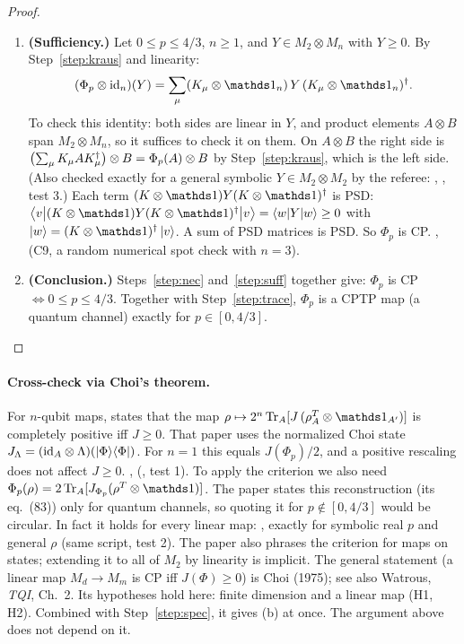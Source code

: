 \documentclass[11pt]{article}
\begin{document}
\begin{proof}
\begin{enumerate}
  \item\label{step:suff} \textbf{(Sufficiency.)} Let $0\le p\le4/3$, $n\ge1$, and
    $Y\in M_2\otimes M_n$ with $Y\ge0$. By Step~\ref{step:kraus} and linearity:
    \begin{equation}\label{eq:ampl}
      (\Phi_p\otimes\mathrm{id}_n)(Y)=\sum_\mu (K_\mu\otimes \id_n)\,Y\,(K_\mu\otimes \id_n)\dg.
    \end{equation}
    To check this identity: both sides are linear in $Y$, and product elements $A\otimes B$ span
    $M_2\otimes M_n$, so it suffices to check it on them. On $A\otimes B$ the right side is
    $\bigl(\sum_\mu K_\mu AK_\mu^{\dagger}\bigr)\otimes B=\Phi_p(A)\otimes B$ by
    Step~\ref{step:kraus}, which is the left side. (Also checked exactly for a general symbolic
    $Y\in M_2\otimes M_2$ by the referee: \computed, ,
    test 3.) Each term $(K\otimes \id)Y(K\otimes \id)\dg$ is PSD:
    $\matel{v}{(K\otimes \id)Y(K\otimes \id)\dg}{v}=\matel{w}{Y}{w}\ge0$ with
    $\ket{w}=(K\otimes \id)\dg\ket{v}$. A sum of PSD matrices is PSD. So $\Phi_p$ is CP. \own,
    \computed{} (C9, a random numerical spot check with $n=3$).

  \item\label{step:concl} \textbf{(Conclusion.)} Steps~\ref{step:nec} and~\ref{step:suff}
    together give: $\Phi_p$ is CP $\iff 0\le p\le4/3$. Together with Step~\ref{step:trace},
    $\Phi_p$ is a CPTP map (a quantum channel) exactly for $p\in[0,4/3]$.
\end{enumerate}
\end{proof}

\paragraph{Cross-check via Choi's theorem.} For $n$-qubit maps,
\cite[unnumbered statement before Lemma~67, p.~25 (PDF page)]{bu-gu-jaffe-magic} states that the
map $\rho\mapsto 2^n\ptr{A}[J\,(\rho_A^{T}\otimes \id_{A'})]$ is completely positive iff $J\ge0$.
\paper{} That paper uses the normalized Choi state
$J_\Lambda=(\mathrm{id}_A\otimes\Lambda)(\left\lvert \Phi \right\rangle\!\left\langle \Phi \right\rvert)$. For $n=1$ this equals $J(\Phi_p)/2$, and a
positive rescaling does not affect $J\ge0$. \own, \computed{}
(, test 1). To apply the criterion we also need
$\Phi_p(\rho)=2\ptr{A}[J_{\Phi_p}(\rho^{T}\otimes \id)]$. The paper states this reconstruction (its
eq.~(83)) only for quantum channels, so quoting it for $p\notin[0,4/3]$ would be circular. In fact
it holds for every linear map: \own, \computed{} exactly for symbolic real $p$ and general $\rho$
(same script, test 2). The paper also phrases the criterion for maps on states; extending it to
all of $M_2$ by linearity is implicit. The general statement (a linear map $M_d\to M_m$ is CP iff
$J(\Phi)\ge0$) is Choi (1975); see also Watrous, \emph{TQI}, Ch.~2. Its hypotheses hold here:
finite dimension and a linear map (H1, H2). Combined with Step~\ref{step:spec}, it gives (b) at
once. The argument above does not depend on it.
\end{document}
